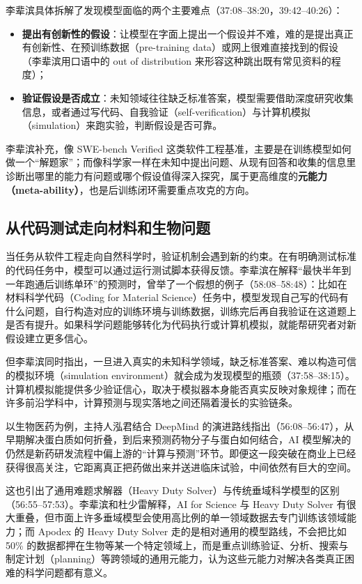 \documentclass[UTF8,a4paper,11pt,fontset=fandol]{ctexart}
\begin{document}
李辈滨具体拆解了发现模型面临的两个主要难点（37:08–38:20，39:42–40:26）：
\begin{itemize}
\item \textbf{提出有创新性的假设}：让模型在字面上提出一个假设并不难，难的是提出真正有创新性、在预训练数据（pre-training data）或网上很难直接找到的假设（李辈滨用口语中的 out of distribution 来形容这种跳出既有常见资料的程度）；
\item \textbf{验证假设是否成立}：未知领域往往缺乏标准答案，模型需要借助深度研究收集信息，或者通过写代码、自我验证（self-verification）与计算机模拟（simulation）来跑实验，判断假设是否可靠。
\end{itemize}
李辈滨补充，像 SWE-bench Verified 这类软件工程基准，主要是在训练模型如何做一个“解题家”；而像科学家一样在未知中提出问题、从现有回答和收集的信息里诊断出哪里的能力有问题或哪个假设值得深入探究，属于更高维度的\textbf{元能力（meta-ability）}，也是后训练闭环需要重点攻克的方向。

\subsection{从代码测试走向材料和生物问题}
当任务从软件工程走向自然科学时，验证机制会遇到新的约束。在有明确测试标准的代码任务中，模型可以通过运行测试脚本获得反馈。李辈滨在解释“最快半年到一年跑通后训练单环”的预测时，曾举了一个假想的例子（58:08–58:48）：比如在材料科学代码（Coding for Material Science）任务中，模型发现自己写的代码有什么问题，自行构造对应的训练环境与训练数据，训练完后再自我验证在这道题上是否有提升。如果科学问题能够转化为代码执行或计算机模拟，就能帮研究者对新假设建立更多信心。

但李辈滨同时指出，一旦进入真实的未知科学领域，缺乏标准答案、难以构造可信的模拟环境（simulation environment）就会成为发现模型的瓶颈（37:58–38:15）。计算机模拟能提供多少验证信心，取决于模拟器本身能否真实反映对象规律；而在许多前沿学科中，计算预测与现实落地之间还隔着漫长的实验链条。

以生物医药为例，主持人泓君结合 DeepMind 的演进路线指出（56:08–56:47），从早期解决蛋白质如何折叠，到后来预测药物分子与蛋白如何结合，AI 模型解决的仍然是新药研发流程中偏上游的“计算与预测”环节。即便这一段突破在商业上已经获得很高关注，它距离真正把药做出来并送进临床试验，中间依然有巨大的空间。

这也引出了通用难题求解器（Heavy Duty Solver）与传统垂域科学模型的区别（56:55–57:53）。李辈滨和杜少雷解释，AI for Science 与 Heavy Duty Solver 有很大重叠，但市面上许多垂域模型会使用高比例的单一领域数据去专门训练该领域能力；而 Apodex 的 Heavy Duty Solver 走的是相对通用的模型路线，不会把比如 50\% 的数据都押在生物等某一个特定领域上，而是重点训练验证、分析、搜索与制定计划（planning）等跨领域的通用元能力，认为这些元能力对解决各类真正困难的科学问题都有意义。
\end{document}
